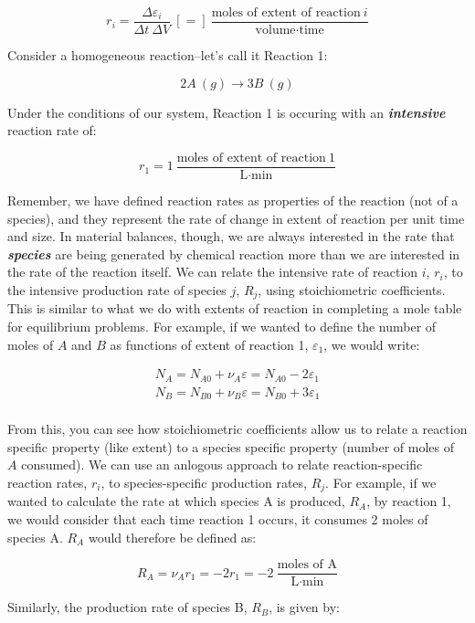 \documentclass[11pt]{article}
\begin{document}
\[r_i = \frac{\Delta \varepsilon_i}{\Delta t \ \Delta V} \ [=] \ \frac{\text{moles of extent of reaction} \ i}{\text{volume} \cdot \text{time}}\]

Consider a homogeneous reaction--let's call it Reaction 1:

\[2A \ (g) \longrightarrow 3B \ (g)\]

Under the conditions of our system, Reaction 1 is occuring with an
\textbf{\emph{intensive}} reaction rate of:

\[r_1 = 1 \ \frac{\text{moles of extent of reaction} \ 1}{\text{L} \cdot \text{min}}\]

Remember, we have defined reaction rates as properties of the reaction
(not of a species), and they represent the rate of change in extent of
reaction per unit time and size. In material balances, though, we are
always interested in the rate that \textbf{\emph{species}} are being
generated by chemical reaction more than we are interested in the rate
of the reaction itself. We can relate the intensive rate of reaction
\(i\), \(r_i\), to the intensive production rate of species \(j\),
\(R_j\), using stoichiometric coefficients. This is similar to what we
do with extents of reaction in completing a mole table for equilibrium
problems. For example, if we wanted to define the number of moles of
\(A\) and \(B\) as functions of extent of reaction 1, \(\varepsilon_1\),
we would write:

\begin{align}
    N_A = N_{A0} + \nu_A \varepsilon = N_{A0} - 2 \varepsilon_1 \\
    N_B = N_{B0} + \nu_B \varepsilon = N_{B0} + 3 \varepsilon_1 \\
\end{align}

From this, you can see how stoichiometric coefficients allow us to
relate a reaction specific property (like extent) to a species specific
property (number of moles of \(A\) consumed). We can use an anlogous
approach to relate reaction-specific reaction rates, \(r_i\), to
species-specific production rates, \(R_j\). For example, if we wanted to
calculate the rate at which species A is produced, \(R_A\), by reaction
1, we would consider that each time reaction 1 occurs, it consumes 2
moles of species A. \(R_A\) would therefore be defined as:

\[R_A = \nu_A r_1 = -2r_1 = -2 \ \frac{\text{moles \ of \ A}}{\text{L} \cdot \text{min}}\]

Similarly, the production rate of species B, \(R_B\), is given by:
\end{document}
